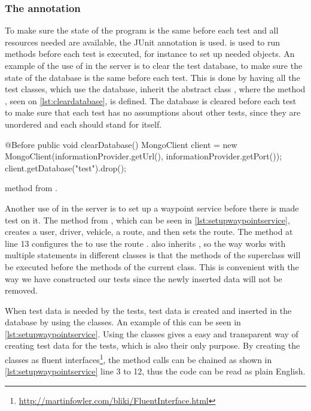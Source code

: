 \subsubsection{The  annotation}
To make sure the state of the program is the same before each test and all resources needed are available,
the JUnit annotation  is used.
 is used to run methods before each test is executed, 
for instance to set up needed objects\cite{before_doc}.
An example of the use of  in the server is to clear the test database,
to make sure the state of the database is the same before each test.
This is done by having all the test classes, which use the database, inherit the abstract class ,
where the method , seen on \cref{lst:cleardatabase}, is defined.
The database is cleared before each test to make sure that each test has no assumptions about other tests, 
since they are unordered and each should stand for itself.

\begin{listing}
    \begin{java2}
        @Before
        public void clearDatabase() {
            MongoClient client = new MongoClient(informationProvider.getUrl(), informationProvider.getPort());
            client.getDatabase("test").drop();
        }
    \end{java2}
    \caption{ method from .}
    \label{lst:cleardatabase}
\end{listing}

Another use of  in the server is to set up a waypoint service before there is made test on it.
The method  from , 
which can be seen in \cref{lst:setupwaypointservice},
creates a user, driver, vehicle, a route, and then sets the route.
The  method at line 13 configures the  to use the route .
 also inherits , 
so the way  works with multiple  statements in different classes 
is that the  methods of the superclass will be executed before the  methods of the current class\cite{before_doc}.
This is convenient with the way we have constructed our tests since the newly inserted data will not be removed. 

\bigskip

When test data is needed by the tests, test data is created and inserted in the database by using the  classes.
An example of this can be seen in \cref{lst:setupwaypointservice}.
Using the  classes gives a easy and transparent way of creating test data for the tests, which is also their only purpose.
By creating the  classes as fluent interfaces\footnote{\url{http://martinfowler.com/bliki/FluentInterface.html}}, the method calls can be chained as shown in \cref{lst:setupwaypointservice} line 3 to 12,
thus the code can be read as plain English.

